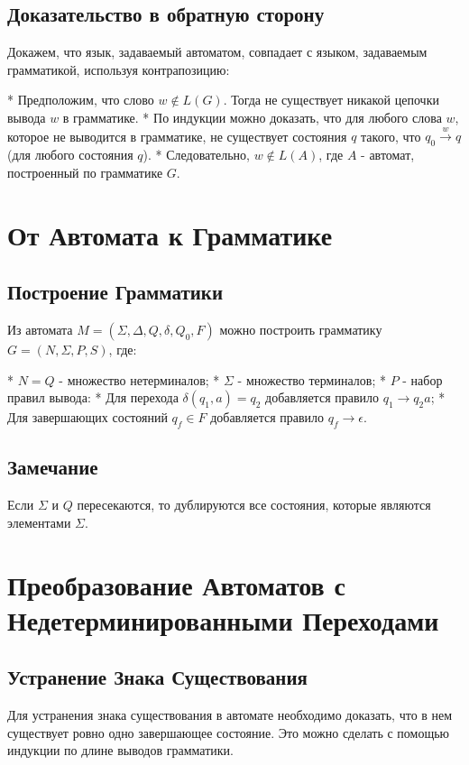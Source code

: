 \documentclass{article}
\begin{document}
\begin{itemize}
\begin{itemize}
\subsection{Доказательство в обратную сторону}

Докажем, что язык, задаваемый автоматом, совпадает с языком, задаваемым грамматикой, используя контрапозицию:

* Предположим, что слово $w\notin L(G)$. Тогда не существует никакой цепочки вывода $w$ в грамматике.
* По индукции можно доказать, что для любого слова $w$, которое не выводится в грамматике, не существует состояния $q$ такого, что $q_0\xrightarrow{w}q$ (для любого состояния $q$).
* Следовательно, $w\notin L(A)$, где $A$ - автомат, построенный по грамматике $G$.
\section{От Автомата к Грамматике}

\subsection{Построение Грамматики}

Из автомата $M = (\Sigma, \Delta, Q, \delta, Q_0, F)$ можно построить грамматику $G = (N, \Sigma, P, S)$, где:

* $N = Q$ - множество нетерминалов;
* $\Sigma$ - множество терминалов;
* $P$ - набор правил вывода:
    * Для перехода $\delta(q_1, a) = q_2$ добавляется правило $q_1 \rightarrow q_2a$;
    * Для завершающих состояний $q_f \in F$ добавляется правило $q_f \rightarrow \epsilon$.

\subsection{Замечание}

Если $\Sigma$ и $Q$ пересекаются, то дублируются все состояния, которые являются элементами $\Sigma$.
\section{Преобразование Автоматов с Недетерминированными Переходами}

\subsection{Устранение Знака Существования}

Для устранения знака существования в автомате необходимо доказать, что в нем существует ровно одно завершающее состояние. Это можно сделать с помощью индукции по длине выводов грамматики.


\end{itemize}
\end{itemize}
\end{document}
